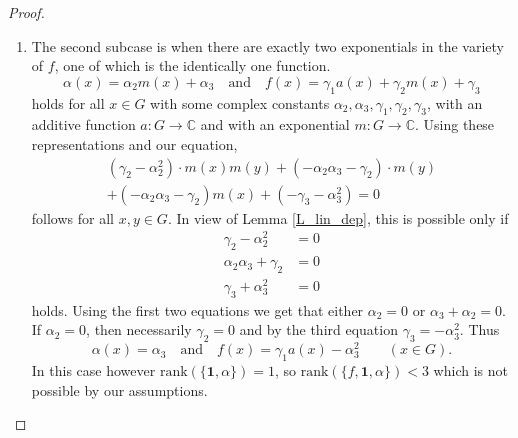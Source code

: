 \documentclass[a4paper,12pt]{article}
\theoremstyle{plain}
\theoremstyle{definition}
\theoremstyle{remark}
\begin{document}
\begin{proof}
\begin{enumerate}[{Subcase} (i)]
\begin{align*}
& - \epsilon_1 \delta_2 a_1(x) a_2(x) - \delta_1 \epsilon_1 a_1(x)^2 
\end{align*}
follows for all $x, y\in G$. As $a_{1}$ and $a_{2}$ are linearly independent additive functions, this is possible only if all the coefficients vanish in the above identity. Especially, the coefficients of $a_{1}(x)a_{1}(y)$ and $a_{2}(x)a_{2}(y)$, that is, $- \alpha_{1}^2$ and $- \alpha_{2}^2$ should equal zero. In this case however, $\alpha_{1}=0$, $\alpha_{2}=0$ and thus $\alpha(x)=\alpha$ follows for all $x\in G$, but then $\mathrm{rank}(\{f, \mathbf{1}, \alpha\})=2$, which is a contradiction. This means that the equation has no solution for which the rank condition would be satisfied. This means that the equation has no solution for which the functions $f$ and $\alpha$ are of the above form. 

\item The second subcase is when there are exactly two exponentials in the variety of $f$, one of which is the identically one function.
\[
 \alpha(x)= \alpha_{2}m(x)+\alpha_{3} 
 \quad 
 \text{and}
 \quad 
 f(x)= \gamma_{1}a(x)+\gamma_{2}m(x)+\gamma_{3} 
\]
holds for all $x\in G$ with some complex constants $\alpha_{2}, \alpha_{3}, \gamma_{1}, \gamma_{2}, \gamma_{3}$, with an additive function $a\colon G\to \mathbb{C}$ and with an exponential $m\colon G\to \mathbb{C}$. Using these representations and our equation, 
\begin{multline*}
(\gamma_2- \alpha_2^2) \cdot m(x) m(y)
+
(- \alpha_2 \alpha_3 - \gamma_2) \cdot m(y)
\\
+(- \alpha_2 \alpha_3 - \gamma_2) m(x)
+(- \gamma_3 - \alpha_3^2)
=0
\end{multline*}
follows for all $x, y\in G$. In view of Lemma \ref{L_lin_dep}, this is possible only if 
\begin{align*}
 \gamma_2- \alpha_2^2 &=0\\
 \alpha_2 \alpha_3 + \gamma_2&=0\\
 \gamma_3  + \alpha_3^2&=0
\end{align*}
holds. Using the first two equations we get that either $\alpha_{2}=0$ or $\alpha_{3}+\alpha_{2}=0$. If $\alpha_{2}=0$, then necessarily $\gamma_{2}=0$ and by the third equation $\gamma_{3}=-\alpha_{3}^{2}$. Thus 
\[
 \alpha(x)= \alpha_{3} 
 \quad 
 \text{and}
 \quad 
 f(x)= \gamma_{1}a(x)-\alpha_{3}^{2} 
 \qquad 
 \left(x\in G\right). 
\]
In this case however $\mathrm{rank}(\{\mathbf{1}, \alpha\})=1$, so $\mathrm{rank}(\{f, \mathbf{1}, \alpha\})<3$ which is not possible by our assumptions. 


\end{enumerate}
\end{proof}
\end{document}

